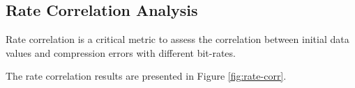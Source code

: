 \subsection{Rate Correlation Analysis}

Rate correlation is a critical metric to assess the correlation between initial data values and compression errors with different bit-rates. 

The rate correlation results are presented in Figure \ref{fig:rate-corr}.

